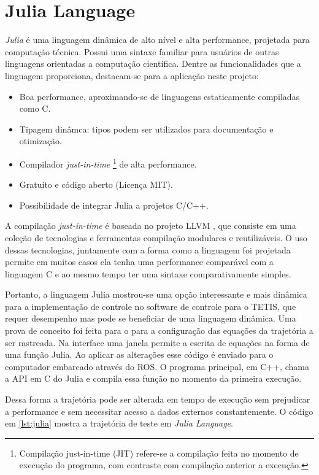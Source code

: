 \section{Julia Language}

\textit{Julia} é uma linguagem dinâmica de alto nível e alta performance, projetada para computação técnica. Possui uma sintaxe familiar para usuários de outras linguagens orientadas a computação científica. Dentre as funcionalidades que a linguagem proporciona, destacam-se para a aplicação neste projeto:

\begin{itemize}
\item Boa performance, aproximando-se de linguagens estaticamente compiladas como C.
\item Tipagem dinâmca: tipos podem ser utilizados para documentação e otimização.
\item Compilador \textit{just-in-time} \footnote{Compilação just-in-time (JIT) refere-se a compilação feita no momento de execução do programa, com contraste com compilação anterior a execução.} de alta performance.
\item Gratuito e código aberto (Licença MIT).
\item Possibilidade de integrar Julia a projetos C/C++.
\end{itemize}

A compilação \textit{just-in-time} é baseada no projeto LLVM \citep{llvmorg,lattner2004llvm}, que consiste em uma coleção de tecnologias e ferramentas compilação modulares e reutilizáveis. O uso dessas tecnologias, juntamente com a forma como a linguagem foi projetada permite em muitos casos ela tenha uma performance comparável com a linguagem C e ao mesmo tempo ter uma sintaxe comparativamente simples.

Portanto, a linguagem Julia mostrou-se uma opção interessante e mais dinâmica para a implementação de controle no software de controle para o TETIS, que requer desempenho mas pode se beneficiar de uma linguagem dinâmica. Uma prova de conceito foi feita para o para a configuração das equações da trajetória a ser rastreada. Na interface uma janela permite a escrita de equações na forma de uma função Julia. Ao aplicar as alterações esse código é enviado para o computador embarcado através do ROS. O programa principal, em C++, chama a API em C do Julia e compila essa função no momento da primeira execução.

Dessa forma a trajetória pode ser alterada em tempo de execução sem prejudicar a performance e sem necessitar acesso a dados externos constantemente. O código em \ref{lst:julia} mostra a trajetória de teste em \textit{Julia Language}.

